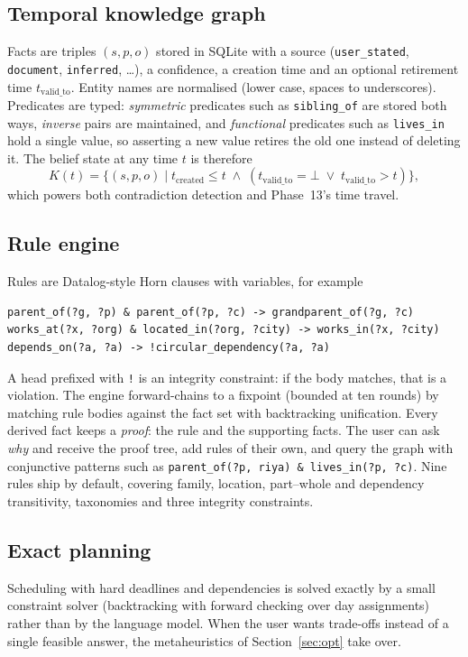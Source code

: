 \documentclass[11pt,a4paper]{article}
\newcommand{\code}[1]{\texttt{#1}}
\begin{document}
\subsection{Temporal knowledge graph}
Facts are triples $(s,p,o)$ stored in SQLite with a source (\code{user\_stated}, \code{document}, \code{inferred}, \ldots), a confidence, a creation time and an optional retirement time $t_{\mathrm{valid\_to}}$. Entity names are normalised (lower case, spaces to underscores). Predicates are typed: \emph{symmetric} predicates such as \code{sibling\_of} are stored both ways, \emph{inverse} pairs are maintained, and \emph{functional} predicates such as \code{lives\_in} hold a single value, so asserting a new value retires the old one instead of deleting it. The belief state at any time $t$ is therefore
\[
  K(t) = \{(s,p,o) \mid t_{\mathrm{created}} \le t \;\wedge\; (t_{\mathrm{valid\_to}} = \bot \;\vee\; t_{\mathrm{valid\_to}} > t)\},
\]
which powers both contradiction detection and Phase~13's time travel.

\subsection{Rule engine}
Rules are Datalog-style Horn clauses with variables, for example
\begin{lstlisting}
parent_of(?g, ?p) & parent_of(?p, ?c) -> grandparent_of(?g, ?c)
works_at(?x, ?org) & located_in(?org, ?city) -> works_in(?x, ?city)
depends_on(?a, ?a) -> !circular_dependency(?a, ?a)
\end{lstlisting}
A head prefixed with \code{!} is an integrity constraint: if the body matches, that is a violation. The engine forward-chains to a fixpoint (bounded at ten rounds) by matching rule bodies against the fact set with backtracking unification. Every derived fact keeps a \emph{proof}: the rule and the supporting facts. The user can ask \emph{why} and receive the proof tree, add rules of their own, and query the graph with conjunctive patterns such as \code{parent\_of(?p, riya) \& lives\_in(?p, ?c)}. Nine rules ship by default, covering family, location, part--whole and dependency transitivity, taxonomies and three integrity constraints.

\subsection{Exact planning}
Scheduling with hard deadlines and dependencies is solved exactly by a small constraint solver (backtracking with forward checking over day assignments) rather than by the language model. When the user wants trade-offs instead of a single feasible answer, the metaheuristics of Section~\ref{sec:opt} take over.
\end{document}
